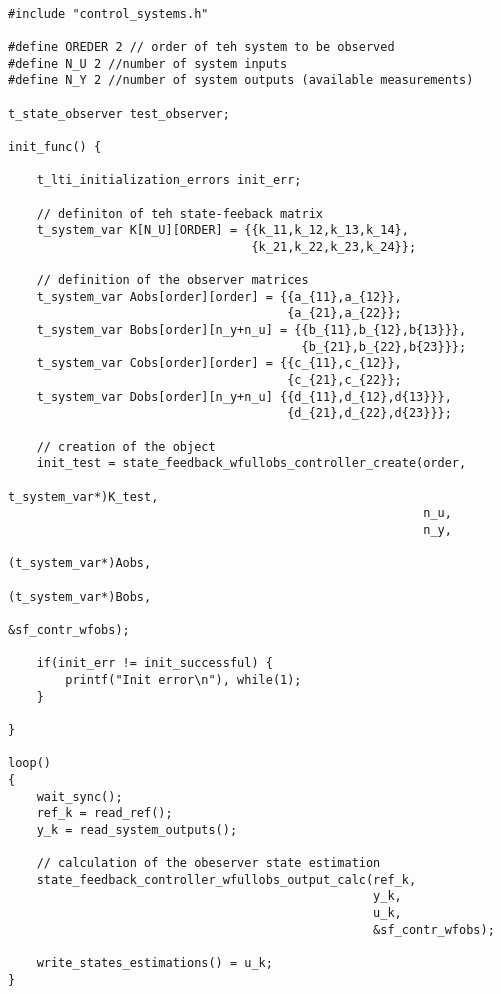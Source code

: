 \documentclass[12pt]{Template_}
\begin{document}
\begin{verbatim}

#include "control_systems.h"

#define OREDER 2 // order of teh system to be observed
#define N_U 2 //number of system inputs
#define N_Y 2 //number of system outputs (available measurements)

t_state_observer test_observer;

init_func() {

    t_lti_initialization_errors init_err;

    // definiton of teh state-feeback matrix    
    t_system_var K[N_U][ORDER] = {{k_11,k_12,k_13,k_14},
                                  {k_21,k_22,k_23,k_24}};
								 
    // definition of the observer matrices
    t_system_var Aobs[order][order] = {{a_{11},a_{12}},
                                       {a_{21},a_{22}};
    t_system_var Bobs[order][n_y+n_u] = {{b_{11},b_{12},b{13}}},
                                         {b_{21},b_{22},b{23}}};
    t_system_var Cobs[order][order] = {{c_{11},c_{12}},
                                       {c_{21},c_{22}}; 
    t_system_var Dobs[order][n_y+n_u] {{d_{11},d_{12},d{13}}},
                                       {d_{21},d_{22},d{23}}};
    
    // creation of the object
    init_test = state_feedback_wfullobs_controller_create(order,
                                                          t_system_var*)K_test, 
                                                          n_u, 
                                                          n_y, 
                                                         (t_system_var*)Aobs,
                                                         (t_system_var*)Bobs, 
                                                          &sf_contr_wfobs);	
        
    if(init_err != init_successful) {
        printf("Init error\n"), while(1);
    }

}

loop() 
{
    wait_sync();
    ref_k = read_ref();
    y_k = read_system_outputs();
	
    // calculation of the obeserver state estimation
    state_feedback_controller_wfullobs_output_calc(ref_k, 
                                                   y_k, 
                                                   u_k, 
                                                   &sf_contr_wfobs);
  								
    write_states_estimations() = u_k;
}
\end{verbatim}
\end{document}
